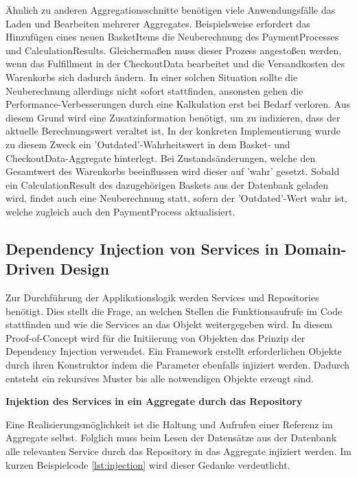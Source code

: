 Ähnlich zu anderen Aggregationsschnitte benötigen viele Anwendungsfälle das Laden und Bearbeiten mehrerer Aggregates. Beispielsweise erfordert das Hinzufügen eines neuen BasketItems die Neuberechnung des PaymentProcesses und CalculationResults. Gleichermaßen muss dieser Prozess angestoßen werden, wenn das Fulfillment in der CheckoutData bearbeitet und die Versandkosten des Warenkorbs sich dadurch ändern. In einer solchen Situation sollte die Neuberechnung allerdings nicht sofort stattfinden, ansonsten gehen die Performance-Verbesserungen durch eine Kalkulation erst bei Bedarf verloren. Aus diesem Grund wird eine Zusatzinformation benötigt, um zu indizieren, dass der aktuelle Berechnungswert veraltet ist. In der konkreten Implementierung wurde zu diesem Zweck ein 'Outdated'-Wahrheitswert in dem Basket- und CheckoutData-Aggregate hinterlegt. Bei Zustandsänderungen, welche den Gesamtwert des Warenkorbs beeinflussen wird dieser auf 'wahr' gesetzt. Sobald ein CalculationResult des dazugehörigen Baskets aus der Datenbank geladen wird, findet auch eine Neuberechnung statt, sofern der 'Outdated'-Wert wahr ist, welche zugleich auch den PaymentProcess aktualisiert. 

\subsection{Dependency Injection von Services in Domain-Driven Design}

Zur Durchführung der Applikationslogik werden Services und Repositories benötigt. Dies stellt die Frage, an welchen Stellen die Funktionsaufrufe im Code stattfinden und wie die Services an das Objekt weitergegeben wird. In diesem Proof-of-Concept wird für die Initiierung von Objekten das Prinzip der Dependency Injection verwendet. Ein Framework erstellt erforderlichen Objekte durch ihren Konstruktor indem die Parameter ebenfalls injiziert werden. Dadurch entsteht ein rekursives Muster bis alle notwendigen Objekte erzeugt sind.

\textbf{Injektion des Services in ein Aggregate durch das Repository}

Eine Realisierungsmöglichkeit ist die Haltung und Aufrufen einer Referenz im Aggregate selbst. Folglich muss beim Lesen der Datensätze aus der Datenbank alle relevanten Service durch das Repository in das Aggregate injiziert werden. Im kurzen Beispielcode \ref{lst:injection} wird dieser Gedanke verdeutlicht.

